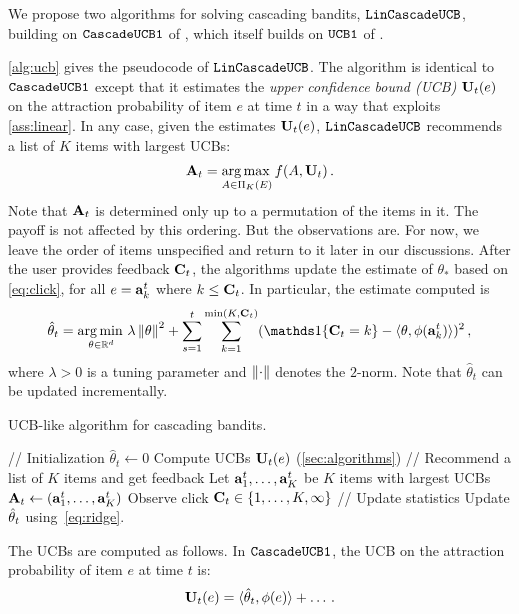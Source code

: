 We propose two algorithms for solving cascading bandits, ${\tt LinCascadeUCB}$, building on ${\tt CascadeUCB1}$ of 
  \citet{kveton15cascade}, which itself builds on ${\tt UCB1}$ of \cite{auer02finitetime}.

\cref{alg:ucb} gives the pseudocode of ${\tt LinCascadeUCB}$. 
The algorithm is identical to ${\tt CascadeUCB1}$ except that it estimates the 
\emph{upper confidence bound (UCB)} $\mathbf{U}_t(e)$ on the attraction probability of item $e$ at time $t$
in a way that exploits \cref{ass:linear}. In any case, given the estimates $\mathbf{U}_t(e)$,
${\tt LinCascadeUCB}$ recommends a list of $K$ items with largest UCBs:
\begin{align}
  \mathbf{A}_t = \operatorname*{arg\,max\,}_{A \in \Pi_K(E)} f(A, \mathbf{U}_t)\,.
\end{align}
Note that $\mathbf{A}_t$ is determined only up to a permutation of the items in it. The payoff is not affected by this ordering. But the observations are. For now, we leave the order of items unspecified and return to it later in our discussions. After the user provides feedback $\mathbf{C}_t$, the algorithms update the estimate of $\theta_*$ 
based on \eqref{eq:click}, for all $e = \mathbf{a}^t_k$ where $k \leq \mathbf{C}_t$.
In particular, the estimate computed is
\begin{align}
\label{eq:ridge}
\hat{\theta}_t = \argmin_{\theta\in \R^d}
\lambda \norm{\theta}^2 + 
 \sum_{s=1}^t \sum_{k=1}^{\min(K,\rnd{C}_t)} ( \I{\rnd{C}_t = k} - \ip{\theta,\phi(\rnd{a}^t_k)})^2 \,,
\end{align}
where $\lambda>0$ is a tuning parameter and $\left\|\cdot\right\|$ denotes the $2$-norm.
Note that $\hat{\theta}_t$ can be updated incrementally. 

\begin{algorithm}[t]
  \caption{UCB-like algorithm for cascading bandits.}
  \label{alg:ucb}
  \begin{algorithmic}
    \STATE // Initialization
    \STATE $\hat{\theta}_t \gets 0$
      \STATE Compute UCBs $\mathbf{U}_t(e)$ (\cref{sec:algorithms})
      \STATE // Recommend a list of $K$ items and get feedback
      \STATE Let $\mathbf{a}^t_1, \dots, \mathbf{a}^t_K$ be $K$ items with largest UCBs
      \STATE $\mathbf{A}_t \gets (\mathbf{a}^t_1, \dots, \mathbf{a}^t_K)$
      \STATE Observe click $\mathbf{C}_t \in \left\{1, \dots, K, \infty\right\}$
      \STATE // Update statistics
      \STATE Update $\hat{\mathbf{\theta}}_t$ using~\eqref{eq:ridge}.
    \ENDFOR
  \end{algorithmic}
\end{algorithm}

The UCBs are computed as follows. In ${\tt CascadeUCB1}$, the UCB on the attraction probability of item $e$ at time $t$ is:
\begin{align*}
  \mathbf{U}_t(e) = \langle \hat{\mathbf{\theta}}_t,\phi(e) \rangle + \dots\,.
\end{align*}

